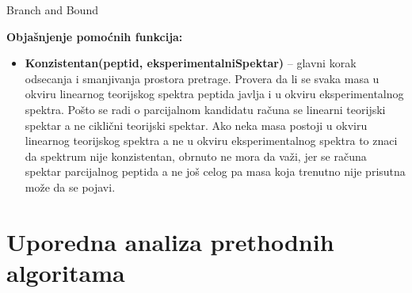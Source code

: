 \documentclass[12pt,oneside]{memoir}
\begin{document}
\begin{algorithm}[H]
\label{alg:branch_and_bound}
\caption{Branch and Bound}
\SetAlgoLined
\DontPrintSemicolon
{}
\end{algorithm}

\noindent
\textbf{Objašnjenje pomoćnih funkcija:}
\begin{itemize}
  \item \textbf{Konzistentan(peptid, eksperimentalniSpektar)} – glavni korak odsecanja i smanjivanja prostora pretrage.  Provera da li se svaka masa u okviru linearnog teorijskog spektra peptida javlja i u okviru eksperimentalnog spektra. Pošto se radi o parcijalnom kandidatu računa se linearni teorijski spektar a ne ciklični teorijski spektar. Ako neka masa postoji u okviru linearnog teorijskog spektra a ne u okviru eksperimentalnog spektra to znaci da spektrum nije konzistentan, obrnuto ne mora da važi, jer se računa spektar parcijalnog peptida a ne još celog pa masa koja trenutno nije prisutna može da se pojavi.
\end{itemize}

\section{Uporedna analiza prethodnih algoritama}
\end{document}
